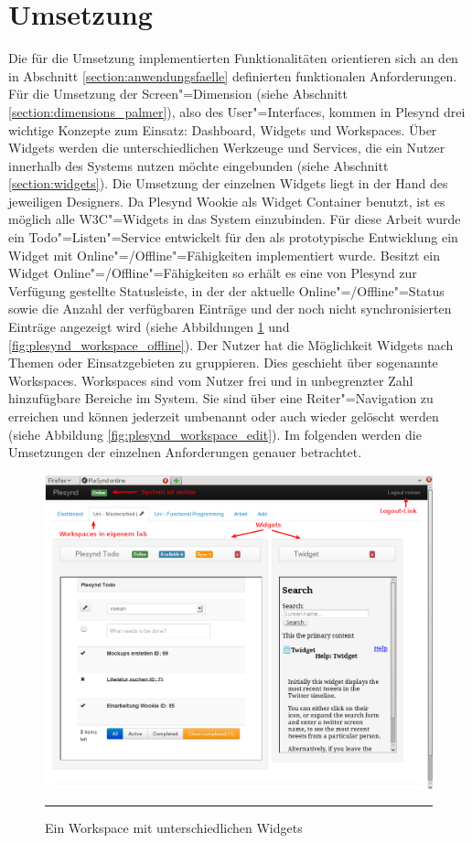 \section{Umsetzung}\label{section:umsetzung}
Die für die Umsetzung implementierten Funktionalitäten orientieren sich an den in Abschnitt \ref{section:anwendungsfaelle} definierten funktionalen Anforderungen. Für die Umsetzung der Screen"=Dimension (siehe Abschnitt \ref{section:dimensions_palmer}), also des User"=Interfaces, kommen in Plesynd drei wichtige Konzepte zum Einsatz: Dashboard, Widgets und Workspaces. Über Widgets werden die unterschiedlichen Werkzeuge und Services, die ein Nutzer innerhalb des Systems nutzen möchte eingebunden (siehe Abschnitt \ref{section:widgets}). Die Umsetzung der einzelnen Widgets liegt in der Hand des jeweiligen Designers. Da Plesynd Wookie als Widget Container benutzt, ist es möglich alle \ac{W3C}"=Widgets in das System einzubinden. Für diese Arbeit wurde ein Todo"=Listen"=Service entwickelt für den als prototypische Entwicklung ein Widget mit Online"=/Offline"=Fähigkeiten implementiert wurde. Besitzt ein Widget Online"=/Offline"=Fähigkeiten so erhält es eine von Plesynd zur Verfügung gestellte Statusleiste, in der der aktuelle Online"=/Offline"=Status sowie die Anzahl der verfügbaren Einträge und der noch nicht synchronisierten Einträge angezeigt wird (siehe Abbildungen \ref{fig:plesynd_workspace_online} und \ref{fig:plesynd_workspace_offline}). Der Nutzer hat die Möglichkeit Widgets nach Themen oder Einsatzgebieten zu gruppieren. Dies geschieht über sogenannte Workspaces. Workspaces sind vom Nutzer frei und in unbegrenzter Zahl hinzufügbare Bereiche im System. Sie sind über eine Reiter"=Navigation zu erreichen und können jederzeit umbenannt oder auch wieder gelöscht werden (siehe Abbildung \ref{fig:plesynd_workspace_edit}). Im folgenden werden die Umsetzungen der einzelnen Anforderungen genauer betrachtet.
\begin{figure}[H]
  \centering
  \includegraphics[width=\textwidth]{./Figures/plesynd_workspace_online.png}
    \rule{35em}{0.5pt}
  \caption[Plesynd User"=Interface: Workspace Online]{Ein Workspace mit unterschiedlichen Widgets}
  \label{fig:plesynd_workspace_online}
\end{figure}


